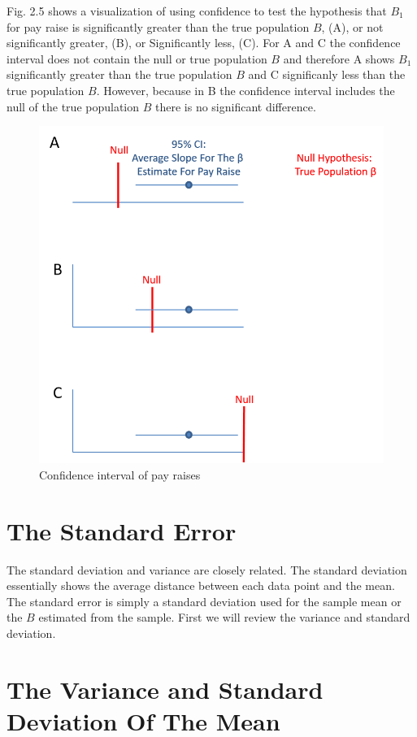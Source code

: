 \documentclass[]{book}
\theoremstyle{definition}
\theoremstyle{definition}
\theoremstyle{definition}
\theoremstyle{remark}
\begin{document}
Fig. 2.5 shows a visualization of using confidence to test the
hypothesis that \(B_{1}\) for pay raise is significantly greater than
the true population \(B\), (A), or not significantly greater, (B), or
Significantly less, (C). For A and C the confidence interval does not
contain the null or true population \(B\) and therefore A shows
\(B_{1}\) significantly greater than the true population \(B\) and C
significanly less than the true population \(B\). However, because in B
the confidence interval includes the null of the true population \(B\)
there is no significant difference.

\begin{figure}

{\centering \includegraphics[width=0.5\linewidth]{figures/Confidence_Interval_Examples_B_Pay_Raise} 

}

\caption{Confidence interval of pay raises}\label{fig:pay-conf-int}
\end{figure}

\hypertarget{the-standard-error}{%
\section{The Standard Error}\label{the-standard-error}}

The standard deviation and variance are closely related. The standard
deviation essentially shows the average distance between each data point
and the mean. The standard error is simply a standard deviation used for
the sample mean or the \(B\) estimated from the sample. First we will
review the variance and standard deviation.

\hypertarget{the-variance-and-standard-deviation-of-the-mean}{%
\section{The Variance and Standard Deviation Of The
Mean}\label{the-variance-and-standard-deviation-of-the-mean}}
\end{document}
